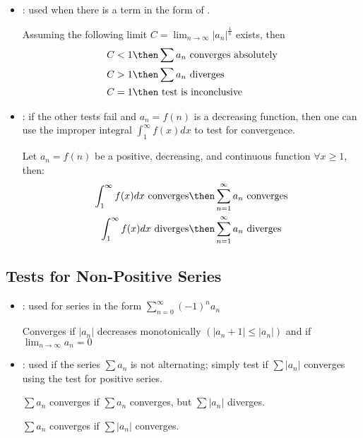 \begin{itemize}
  \item {}: used when there is a term in the form of
    .

    Assuming the following limit \(C = \lim_{n \to \infty}
    |a_n|^{\frac{1}{n}} \) exists, then
    \begin{align*}
      C &< 1 \then \sum a_n ~\text{converges absolutely} \\
      C &> 1 \then \sum a_n ~\text{diverges} \\
      C &= 1 \then ~\text{test is inconclusive}~
    \end{align*}

  \item {}: if the other tests fail and \(a_n = f(n)\) is
    a decreasing function, then one can use the improper integral
    \(\int_1^\infty f(x)dx\) to test for convergence.

    Let \(a_n = f(n)\) be a positive, decreasing, and continuous function
    \(\forall x \geq 1\), then:
    \begin{align*}
      \int_1^\infty f(x)dx ~\text{converges} &\then \sum_{n=1}^{\infty}
      a_n ~\text{converges}\\
      \int_1^\infty f(x)dx ~\text{diverges} &\then \sum_{n=1}^{\infty}
      a_n ~\text{diverges}
    \end{align*}
\end{itemize}

\subsection{Tests for Non-Positive Series}
\vspace{-8pt}
  \begin{itemize}
    \item {}: used for series in the form
      \(%
      \displaystyle  \sum_{n=0}^{\infty} (-1)^n a_n
      \)%

      Converges if \(|a_n|\) decreases monotonically \(\left(|a_n+1| \leq |a_n|\right)\)
      and if \(\lim_{n \to \infty} a_n = 0\)

      \vspace{16pt}

    \item {}: used if the series \(\sum a_n\) is not
      alternating; simply test if \(\sum |a_n| \) converges using the test
      for positive series.

      \vspace{16pt}

      \(\sum a_n\) converges  if \(\sum a_n\) converges, but \(\sum
      |a_n|\) diverges.

      \(\sum a_n\) converges  if \(\sum |a_n|\) converges.


  \end{itemize}


